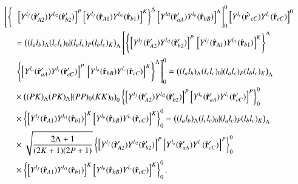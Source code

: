 \begin{equation}\label{eq221}
\begin{split}
\left [\left\lbrace  \vphantom{\left.\left[ Y ^{l_{i1}}\right]^{K}\right\rbrace ^\Lambda} \right. \right.&\left.\left.
\left[Y^{l_f} (\hat{\mathbf{r}}'_{A2})
  Y^{l_{i2}} (\hat{\mathbf{r}}'_{b2}) \right]^{P}
  \left[ Y ^{l_f} (\hat{\mathbf{r}}_{A1}) Y ^{l_{i1}} (\hat{\mathbf{r}}_{b1}) \right]^{K} \right\rbrace ^\Lambda\left[Y^{la} (\hat{\mathbf{r}}'_{aA}) Y^{l_{b}} (\hat{\mathbf{r}}_{bB}) \right]^{\Lambda}\right ]_0^0\left[ Y ^{l_c} (\hat{\mathbf{r}'}_{cC}) Y ^{l_{c}} (\hat{\mathbf{r}}_{cC}) \right]^{0}\\
  &=\bigl ((l_a l_b)_\Lambda (l_c l_c)_0 |(l_a l_c)_P (l_b l_c)_K \bigr )_\Lambda \left [\left\lbrace  \left[Y^{l_f} (\hat{\mathbf{r}}'_{A2})
  Y^{l_{i2}} (\hat{\mathbf{r}}'_{b2}) \right]^{P}  \vphantom{\left.\left[ Y ^{l_{i1}}\right]^{K} \right\rbrace ^\Lambda}
  \left[ Y ^{l_f} (\hat{\mathbf{r}}_{A1}) Y ^{l_{i1}} (\hat{\mathbf{r}}_{b1}) \right]^{K} \right\rbrace ^\Lambda \right.\\
  &\left.\left\lbrace  \left[Y^{l_a} (\hat{\mathbf{r}}'_{aA})
  Y^{l_{c}} (\hat{\mathbf{r}}'_{cC}) \right]^{P}  \vphantom{\left.\left[ Y ^{l_{i1}}\right]^{K} \right\rbrace ^\Lambda}
  \left[ Y ^{l_b} (\hat{\mathbf{r}}_{bB}) Y ^{l_{c}} (\hat{\mathbf{r}}_{cC}) \right]^{K} \right\rbrace ^\Lambda \right]_0^0=\bigl ((l_a l_b)_\Lambda (l_c l_c)_0 |(l_a l_c)_P (l_b l_c)_K \bigr )_\Lambda\\
  &\times \bigl ((PK)_\Lambda (PK)_\Lambda |(PP)_0 (KK)_0 \bigr )_0\left\lbrace  \left[Y^{l_f} (\hat{\mathbf{r}}'_{A2})
  Y^{l_{i2}} (\hat{\mathbf{r}}'_{b2}) \right]^{P}
  \left[ Y ^{l_a} (\hat{\mathbf{r}}'_{aA}) Y ^{l_{c}} (\hat{\mathbf{r}}'_{cC}) \right]^{P} \right\rbrace ^0_0\\
  &\times\left\lbrace  \left[Y^{l_f} (\hat{\mathbf{r}}_{A1})
  Y^{l_{i1}} (\hat{\mathbf{r}}_{b1}) \right]^{K}
  \left[ Y ^{l_b} (\hat{\mathbf{r}}_{bB}) Y ^{l_{c}} (\hat{\mathbf{r}}_{cC}) \right]^{K} \right\rbrace ^0_0=\bigl ((l_a l_b)_\Lambda (l_c l_c)_0 |(l_a l_c)_P (l_b l_c)_K \bigr )_\Lambda\\
  &\times \sqrt{\frac{2\Lambda+1}{(2K+1)(2P+1)}}\left\lbrace  \left[Y^{l_f} (\hat{\mathbf{r}}'_{A2})
  Y^{l_{i2}} (\hat{\mathbf{r}}'_{b2}) \right]^{P}
  \left[ Y ^{l_a} (\hat{\mathbf{r}}'_{aA}) Y ^{l_{c}} (\hat{\mathbf{r}}'_{cC}) \right]^{P} \right\rbrace ^0_0\\
  &\times\left\lbrace  \left[Y^{l_f} (\hat{\mathbf{r}}_{A1})
  Y^{l_{i1}} (\hat{\mathbf{r}}_{b1}) \right]^{K}
  \left[ Y ^{l_b} (\hat{\mathbf{r}}_{bB}) Y ^{l_{c}} (\hat{\mathbf{r}}_{cC}) \right]^{K} \right\rbrace ^0_0.
 \end{split}
\end{equation}
